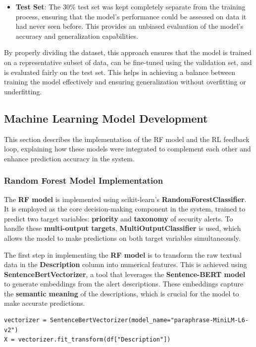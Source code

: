 \begin{itemize}
    \item \textbf{Test Set}: The 30\% test set was kept completely separate from the training process, ensuring that the model's performance could be assessed on data it had never seen before. This provides an unbiased evaluation of the model's accuracy and generalization capabilities.
\end{itemize}

By properly dividing the dataset, this approach ensures that the model is trained on a representative subset of data, can be fine-tuned using the validation set, and is evaluated fairly on the test set. 
This helps in achieving a balance between training the model effectively and ensuring generalization without overfitting or underfitting.

\subsection{Machine Learning Model Development}
This section describes the implementation of the RF model and the RL feedback loop, explaining how these models were integrated to complement each other and enhance prediction accuracy in the system.

\subsubsection{Random Forest Model Implementation}

The \textbf{RF model} is implemented using scikit-learn's \textbf{RandomForestClassifier}. 
It is employed as the core decision-making component in the system, trained to predict two target variables: \textbf{priority} and \textbf{taxonomy} of security alerts. 
To handle these \textbf{multi-output targets}, \textbf{MultiOutputClassifier} is used, which allows the model to make predictions on both target variables simultaneously.

The first step in implementing the \textbf{RF model} is to transform the raw textual data in the \textbf{Description} column into numerical features. 
This is achieved using \textbf{SentenceBertVectorizer}, a tool that leverages the \textbf{Sentence-BERT model} to generate embeddings from the alert descriptions. 
These embeddings capture the \textbf{semantic meaning} of the descriptions, which is crucial for the model to make accurate predictions.

\vspace{0.2cm}
\noindent
\begin{minipage}{\linewidth}
\begin{verbatim}
vectorizer = SentenceBertVectorizer(model_name="paraphrase-MiniLM-L6-v2")
X = vectorizer.fit_transform(df["Description"])
\end{verbatim}
\label{lst:vectorizing_text_data}
\end{minipage}
\vspace{0.1cm}

